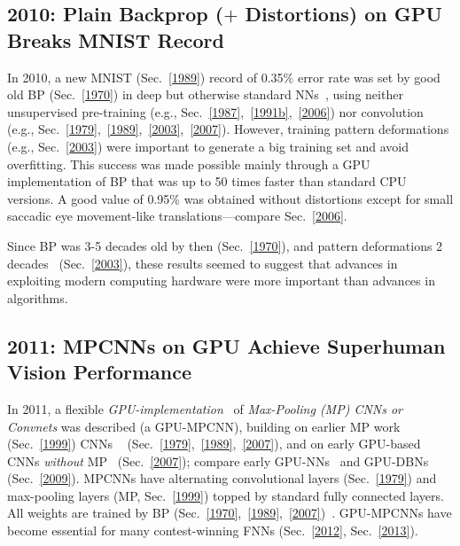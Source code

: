 \documentclass[letterpaper]{article}
\begin{document}
\begin{CJK*}{UTF8}{gbsn}
\begin{sloppypar}
\subsection{2010: Plain Backprop ($+$ Distortions) on GPU Breaks MNIST Record}
\label{2010}

 In 2010, a new MNIST (Sec.~\ref{1989}) record of 0.35\% error rate was set 
by good old BP (Sec.~\ref{1970}) in deep but otherwise
standard NNs~\citep{ciresan:2010}, 
using neither unsupervised pre-training 
(e.g., Sec.~\ref{1987},~\ref{1991b},~\ref{2006}) nor convolution 
(e.g., Sec.~\ref{1979},~\ref{1989},~\ref{2003},~\ref{2007}).
However,  training pattern
deformations (e.g., Sec.~\ref{2003}) were important to generate a big training set
and avoid overfitting.
This success was made possible mainly through a  GPU implementation of BP that was up to 50 times faster than standard
CPU versions. 
A good value of 0.95\% was obtained
without distortions except for small saccadic eye movement-like translations---compare
Sec.~\ref{2006}.

Since BP was 3-5 decades old by then (Sec.~\ref{1970}),
and pattern deformations 2 decades~\citep{Baird90} (Sec.~\ref{2003}),
these results seemed to suggest that
advances in exploiting modern
computing hardware were more important than advances in algorithms. 


\subsection{2011: MPCNNs on GPU Achieve Superhuman Vision Performance}
\label{2011}

In 2011, a flexible {\em GPU-implementation}~\citep{ciresan:2011ijcai}
 of {\em Max-Pooling (MP) CNNs or Convnets}  was  described (a GPU-MPCNN),
building on earlier MP work~\citep{weng1992} (Sec.~\ref{1999}) CNNs ~\citep{Fukushima:1979neocognitron,LeCun:89} (Sec.~\ref{1979},~\ref{1989},~\ref{2007}), 
and on early GPU-based CNNs {\em without} MP~\citep{chellapilla:2006b} (Sec.~\ref{2007});
compare  early GPU-NNs~\citep{gpu2004} and GPU-DBNs~\citep{raina2009large} (Sec.~\ref{2009}).
MPCNNs have alternating convolutional layers (Sec.~\ref{1979}) and max-pooling layers (MP, Sec.~\ref{1999}) topped by 
standard fully connected layers. All weights are trained by BP (Sec.~\ref{1970},~\ref{1989},~\ref{2007})~\citep{ranzato-cvpr-07,scherer:2010}.
GPU-MPCNNs have become essential for many contest-winning
FNNs (Sec.~\ref{2012}, Sec.~\ref{2013}).




\end{sloppypar}
\end{CJK*}
\end{document}
